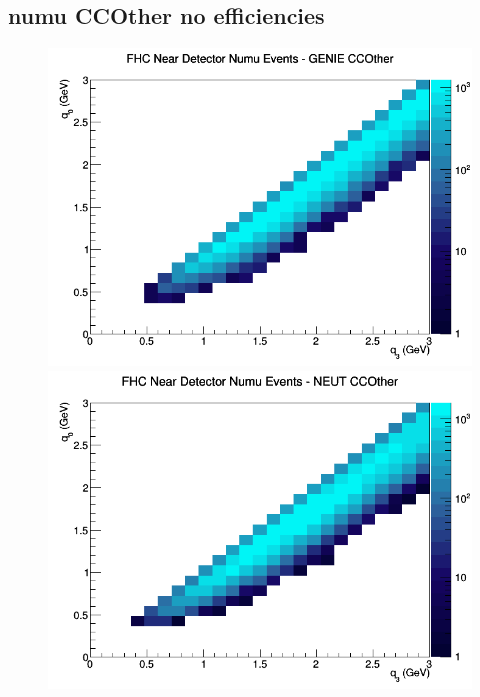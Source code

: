 \subsection{numu CCOther no efficiencies}
\begin{figure}[h]
\includegraphics[width=\linewidth]{q0_q3/nominal/CCOther_FHC_ND_numu_q3_q0_GENIE.png}
\endminipage
{}
\includegraphics[width=\linewidth]{q0_q3/nominal/CCOther_FHC_ND_numu_q3_q0_NEUT.png}
\endminipage
{}

\end{figure}
